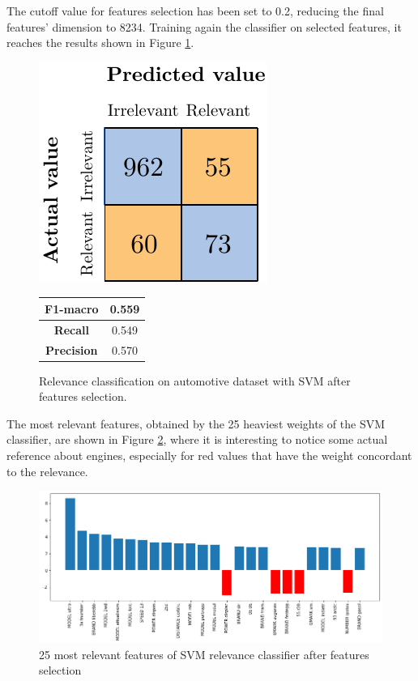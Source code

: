 The cutoff value for features selection has been set to 0.2, reducing the final features' dimension to 8234. Training again the classifier on selected features, it reaches the results shown in Figure \ref{fig:ita_rel_svm_afs}.


\begin{figure}[H]
	\begin{minipage}[b]{0.6\linewidth}
		\centering
	\includegraphics[scale=1]{figures/conf_matrices/ita_rel_svm/ita_rel_svm_afs.pdf}
	\end{minipage}
	\begin{minipage}[b]{0.3\linewidth}
		\begin{tabular}[b]{ | c | c | } 
			\hline
			\textbf{F1-macro} & 0.559 \\
			\hline
			\textbf{Recall} & 0.549 \\ 
			\hline
			\textbf{Precision} & 0.570 \\ 
			\hline
		\end{tabular}
	\end{minipage}
	\caption{Relevance classification on automotive dataset with SVM after features selection.}
	\label{fig:ita_rel_svm_afs}
\end{figure}



The most relevant features, obtained by the 25 heaviest weights of the SVM classifier, are shown in Figure \ref{fig:ita_rel_svm_feat}, where it is interesting to notice some actual reference about engines, especially for red values that have the weight concordant to the relevance.

\begin{figure}[H]
	\centering
	\includegraphics[width=\textwidth]{figures/conf_matrices/ita_rel_svm/svm_rel_best_feat.png}
	\caption{25 most relevant features of SVM relevance classifier after features selection}
	\label{fig:ita_rel_svm_feat}
\end{figure}

